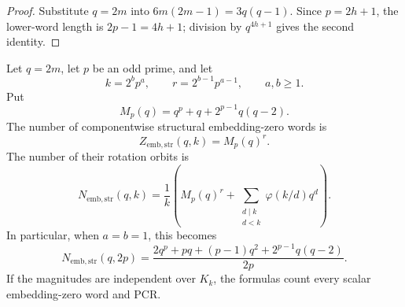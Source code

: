 \begin{proof}
Substitute $q=2m$ into $6m(2m-1)=3q(q-1)$.  Since
$p=2h+1$, the lower-word length is $2p-1=4h+1$; division by
$q^{4h+1}$ gives the second identity.
\end{proof}

\begin{theorem}
\label{thm:twice-prime-embedding}
Let $q=2m$, let $p$ be an odd prime, and let
\[
  k=2^b p^a,\qquad
  r=2^{b-1}p^{a-1},\qquad a,b\ge1.
\]
Put
\[
  M_p(q)=q^p+q+2^{p-1}q(q-2).
\]
The number of componentwise structural embedding-zero words is
\begin{equation}
  Z_{\mathrm{emb,str}}(q,k)=M_p(q)^r.                                   \label{eq:embedding-word-count}
\end{equation}
The number of their rotation orbits is
\begin{equation}
  N_{\mathrm{emb,str}}(q,k)
  =\frac1k\left(
    M_p(q)^r+
    \sum_{\substack{d\mid k\\d<k}}\varphi(k/d)q^d
  \right).                                                              \label{eq:embedding-pcr-count}
\end{equation}
In particular, when $a=b=1$, this becomes
\begin{equation}
  N_{\mathrm{emb,str}}(q,2p)
  =\frac{2q^p+pq+(p-1)q^2+2^{p-1}q(q-2)}{2p}.                           \label{eq:embedding-pcr-twice-prime}
\end{equation}
If the magnitudes are independent over $K_k$, the formulas count every scalar
embedding-zero word and PCR.
\end{theorem}

